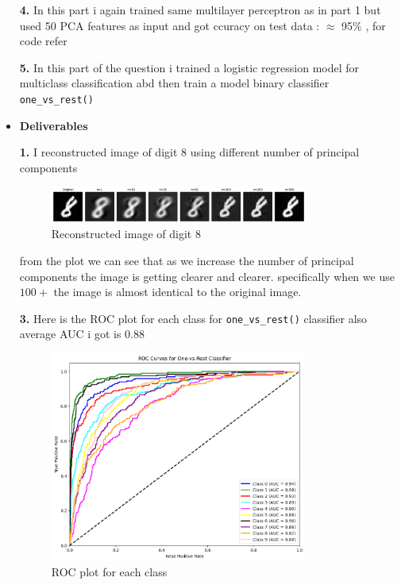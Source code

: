 \documentclass{article}
\begin{document}
\begin{itemize}
\textbf{4.} In this part i again trained same multilayer perceptron as in part 1 but used 50 PCA features as input and got ccuracy on test data : $\approx$ 95\% , for code refer 
\vspace{7pt}

\textbf{5.} In this part of the question i trained a logistic regression model for multiclass classification abd then train a model binary classifier \texttt{one\_vs\_rest()}

\item \textbf{Deliverables}

\textbf{1.} I reconstructed image of digit $8$ using different number of principal components

\begin{figure}[h]
    \centering
    \includegraphics[width=0.8\textwidth]{pca8.png}
    \caption{Reconstructed image of digit 8}
\end{figure}
from the plot we can see that as we increase the number of principal components the image is getting clearer and clearer.
specifically when we use $100+$ the image is almost identical to the original image.

\textbf{3.} Here is the ROC plot for each class for \texttt{one\_vs\_rest()} classifier also average AUC i got is 0.88 
\begin{figure}[h]
    \centering
    \includegraphics[width=0.8\textwidth]{aoc.png}
    \caption{ROC plot for each class}
\end{figure}


\end{itemize}
\end{document}
